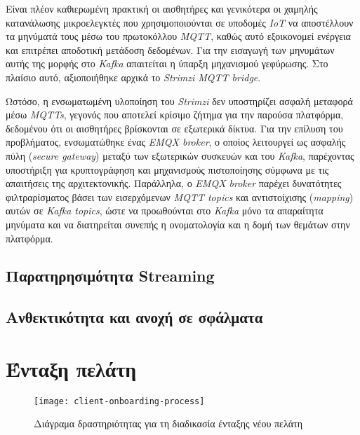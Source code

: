 Είναι πλέον καθιερωμένη πρακτική οι αισθητήρες και γενικότερα οι χαμηλής
κατανάλωσης μικροελεγκτές που χρησιμοποιούνται σε υποδομές \textit{IoT} να
αποστέλλουν τα μηνύματά τους μέσω του πρωτοκόλλου \textit{MQTT}, καθώς αυτό
εξοικονομεί ενέργεια και επιτρέπει αποδοτική μετάδοση δεδομένων. Για την
εισαγωγή των μηνυμάτων αυτής της μορφής στο \textit{Kafka} απαιτείται η ύπαρξη
μηχανισμού γεφύρωσης. Στο πλαίσιο αυτό, αξιοποιήθηκε αρχικά το \textit{Strimzi
	MQTT bridge}.

Ωστόσο, η ενσωματωμένη υλοποίηση του \textit{Strimzi} δεν υποστηρίζει ασφαλή
μεταφορά μέσω \textit{MQTTs}, γεγονός που αποτελεί κρίσιμο ζήτημα για την
παρούσα πλατφόρμα, δεδομένου ότι οι αισθητήρες βρίσκονται σε εξωτερικά δίκτυα.
Για την επίλυση του προβλήματος, ενσωματώθηκε ένας \textit{EMQX broker}, ο
οποίος λειτουργεί ως ασφαλής πύλη (\textit{secure gateway}) μεταξύ των
εξωτερικών συσκευών και του \textit{Kafka}, παρέχοντας υποστήριξη για
κρυπτογράφηση και μηχανισμούς πιστοποίησης σύμφωνα με τις απαιτήσεις της
αρχιτεκτονικής. Παράλληλα, ο \textit{EMQX broker} παρέχει δυνατότητες
φιλτραρίσματος βάσει των εισερχόμενων \textit{MQTT topics} και αντιστοίχισης
(\textit{mapping}) αυτών σε \textit{Kafka topics}, ώστε να προωθούνται στο
\textit{Kafka} μόνο τα απαραίτητα μηνύματα και να διατηρείται συνεπής η
ονοματολογία και η δομή των θεμάτων στην πλατφόρμα.

\subsection{Παρατηρησιμότητα Streaming}

\subsection{Ανθεκτικότητα και ανοχή σε σφάλματα}

\section{Ένταξη πελάτη}

\begin{figure}[H]
	\centering
	\texttt{[image: client-onboarding-process]}
	\caption{Διάγραμα δραστηριότητας για τη διαδικασία ένταξης νέου πελάτη}
	\label{fig:client-onboarding-activity}
\end{figure}
